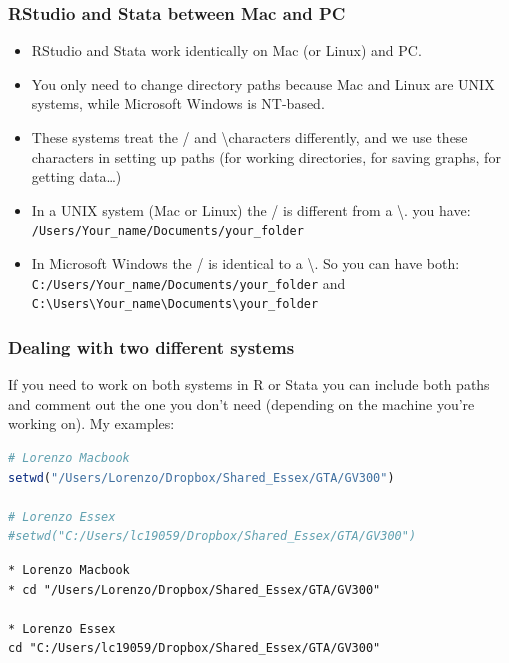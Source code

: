 \documentclass[xcolor=table,dvipsnames]{beamer}
\begin{document}
\begin{frame}[fragile]
\frametitle{RStudio and Stata between Mac and PC}
\begin{itemize}
\item RStudio and Stata work identically on Mac (or Linux) and PC. \pause
\item You only need to change directory paths because Mac and Linux are UNIX systems, while Microsoft Windows is NT-based. \pause
\item These systems treat the / and \textbackslash characters differently, and we use these characters in setting up paths (for working directories, for saving graphs, for getting data\ldots) \pause
\item In a UNIX system (Mac or Linux) the / is different from a \textbackslash. you have: \texttt{/Users/Your\_{}name/Documents/your\_{}folder} \pause
\item In Microsoft Windows the / is identical to a \textbackslash. So you can have both: \texttt{C:/Users/Your\_{}name/Documents/your\_{}folder} and \texttt{C:\textbackslash{}Users\textbackslash{}Your\_{}name\textbackslash{}Documents\textbackslash{}your\_{}folder}
\end{itemize}
\end{frame}

\begin{frame}[fragile]
\frametitle{Dealing with two different systems}
If you need to work on both systems in R or Stata you can include both paths and comment out the one you don't need (depending on the machine you're working on). \pause My examples: \pause
\begin{lstlisting}[language=R]
# Lorenzo Macbook
setwd("/Users/Lorenzo/Dropbox/Shared_Essex/GTA/GV300")

# Lorenzo Essex
#setwd("C:/Users/lc19059/Dropbox/Shared_Essex/GTA/GV300")
\end{lstlisting}

\begin{lstlisting}
* Lorenzo Macbook
* cd "/Users/Lorenzo/Dropbox/Shared_Essex/GTA/GV300"

* Lorenzo Essex
cd "C:/Users/lc19059/Dropbox/Shared_Essex/GTA/GV300"
\end{lstlisting}
\end{frame}
\end{document}
